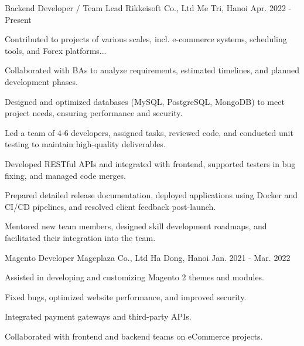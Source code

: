 

\begin{cventries}

  \cventry
    {Backend Developer / Team Lead} %
    {Rikkeisoft Co., Ltd} %
    {Me Tri, Hanoi} %
    {Apr. 2022 - Present} %
    {
      \begin{cvitems} %
        \item {Contributed to projects of various scales, incl. e-commerce systems, scheduling tools, and Forex platforms...}
        \item {Collaborated with BAs to analyze requirements, estimated timelines, and planned development phases.}
        \item {Designed and optimized databases (MySQL, PostgreSQL, MongoDB) to meet project needs, ensuring performance and security.}
        \item {Led a team of 4-6 developers, assigned tasks, reviewed code, and conducted unit testing to maintain high-quality deliverables.}
        \item {Developed RESTful APIs and integrated with frontend, supported testers in bug fixing, and managed code merges.}
        \item {Prepared detailed release documentation, deployed applications using Docker and CI/CD pipelines, and resolved client feedback post-launch.}
        \item {Mentored new team members, designed skill development roadmaps, and facilitated their integration into the team.}
      \end{cvitems}
    }

  \cventry
    {Magento Developer} %
    {Mageplaza Co., Ltd} %
    {Ha Dong, Hanoi} %
    {Jan. 2021 - Mar. 2022} %
    {
      \begin{cvitems} %
        \item {Assisted in developing and customizing Magento 2 themes and modules.}
        \item {Fixed bugs, optimized website performance, and improved security.}
        \item {Integrated payment gateways and third-party APIs.}
        \item {Collaborated with frontend and backend teams on eCommerce projects.}
      \end{cvitems}
    }

\end{cventries}
